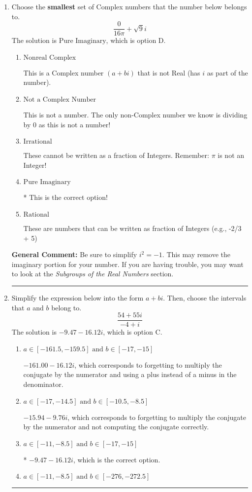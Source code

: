 \documentclass{extbook}[14pt]
\newcommand{\litem}[1]{\item #1

\rule{\textwidth}{0.4pt}}
\begin{document}
\begin{enumerate}\litem{
Choose the \textbf{smallest} set of Complex numbers that the number below belongs to.
\[ \frac{0}{16 \pi}+\sqrt{9}i \]The solution is \( \text{Pure Imaginary} \), which is option D.\begin{enumerate}[label=\Alph*.]
\item \( \text{Nonreal Complex} \)

This is a Complex number $(a+bi)$ that is not Real (has $i$ as part of the number).
\item \( \text{Not a Complex Number} \)

This is not a number. The only non-Complex number we know is dividing by 0 as this is not a number!
\item \( \text{Irrational} \)

These cannot be written as a fraction of Integers. Remember: $\pi$ is not an Integer!
\item \( \text{Pure Imaginary} \)

* This is the correct option!
\item \( \text{Rational} \)

These are numbers that can be written as fraction of Integers (e.g., -2/3 + 5)
\end{enumerate}

\textbf{General Comment:} Be sure to simplify $i^2 = -1$. This may remove the imaginary portion for your number. If you are having trouble, you may want to look at the \textit{Subgroups of the Real Numbers} section.
}
\litem{
Simplify the expression below into the form $a+bi$. Then, choose the intervals that $a$ and $b$ belong to.
\[ \frac{54 + 55 i}{-4 + i} \]The solution is \( -9.47  - 16.12 i \), which is option C.\begin{enumerate}[label=\Alph*.]
\item \( a \in [-161.5, -159.5] \text{ and } b \in [-17, -15] \)

 $-161.00  - 16.12 i$, which corresponds to forgetting to multiply the conjugate by the numerator and using a plus instead of a minus in the denominator.
\item \( a \in [-17, -14.5] \text{ and } b \in [-10.5, -8.5] \)

 $-15.94  - 9.76 i$, which corresponds to forgetting to multiply the conjugate by the numerator and not computing the conjugate correctly.
\item \( a \in [-11, -8.5] \text{ and } b \in [-17, -15] \)

* $-9.47  - 16.12 i$, which is the correct option.
\item \( a \in [-11, -8.5] \text{ and } b \in [-276, -272.5] \)


\end{enumerate}}
\end{enumerate}
\end{document}
